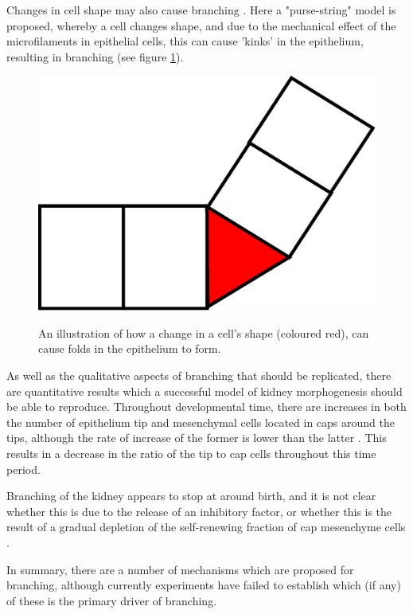 \documentclass[pdftex,10pt,a4paper,twocolumn]{article}
\begin{document}
Changes in cell shape may also cause branching \cite{Meyer2004}. Here a "purse-string" model is proposed, whereby a cell changes shape, and due to the mechanical effect of the microfilaments in epithelial cells, this can cause 'kinks' in the epithelium, resulting in branching (see figure \ref{fig:kink}).

\begin{figure}[t] 
\centering
\scalebox{0.4} 
{\includegraphics{kink.eps}}
\caption{An illustration of how a change in a cell's shape (coloured red), can cause folds in the epithelium to form.}\label{fig:kink}
\end{figure} 


As well as the qualitative aspects of branching that should be replicated, there are quantitative results which a successful model of kidney morphogenesis should be able to reproduce. Throughout developmental time, there are increases in both the number of epithelium tip and mesenchymal cells located in caps around the tips, although the rate of increase of the former is lower than the latter \cite{short2014global}. This results in a decrease in the ratio of the tip to cap cells throughout this time period.

Branching of the kidney appears to stop at around birth, and it is not clear whether this is due to the release of an inhibitory factor, or whether this is the result of a gradual depletion of the self-renewing fraction of cap mesenchyme cells \cite{LittleMMcMahon2012}.

In summary, there are a number of mechanisms which are proposed for branching, although currently experiments have failed to establish which (if any) of these is the primary driver of branching.
\end{document}
